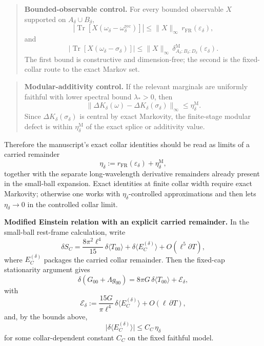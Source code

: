 \begin{quote}
\textbf{Bounded-observable control.} For every bounded observable \(X\) supported on \(A_\delta\cup B_\delta\),
\[
\left|
\operatorname{Tr}\!\left[X(\omega_\delta-\omega_\delta^{\mathrm{rec}})\right]
\right|
\le
\|X\|_\infty\,r_{\mathrm{FR}}(\varepsilon_\delta),
\]
and
\[
\left|
\operatorname{Tr}\!\left[X(\omega_\delta-\sigma_\delta)\right]
\right|
\le
\|X\|_\infty\,
\delta^{\mathrm M}_{A_\delta:B_\delta:D_\delta}(\varepsilon_\delta).
\]
The first bound is constructive and dimension-free; the second is the fixed-collar route to the exact Markov set.
\end{quote}

\begin{quote}
\textbf{Modular-additivity control.} If the relevant marginals are uniformly faithful with lower spectral bound \(\lambda_\ast>0\), then
\[
\|\Delta K_\delta(\omega)-\Delta K_\delta(\sigma_\delta)\|_\infty
\le
\eta_\delta^{\mathrm M}.
\]
Since \(\Delta K_\delta(\sigma_\delta)\) is central by exact Markovity, the finite-stage modular defect is within \(\eta_\delta^{\mathrm M}\) of the exact splice or additivity value.
\end{quote}

Therefore the manuscript's exact collar identities should be read as limits of a carried remainder
\[
\eta_\delta
:=
r_{\mathrm{FR}}(\varepsilon_\delta)
+
\eta_\delta^{\mathrm M},
\]
together with the separate long-wavelength derivative remainders already present in the small-ball expansion. Exact identities at finite collar width require exact Markovity; otherwise one works with \(\eta_\delta\)-controlled approximations and then lets \(\eta_\delta\to0\) in the controlled collar limit.

\textbf{Modified Einstein relation with an explicit carried remainder.} In the small-ball rest-frame calculation, write
\[
\delta S_C
=
\frac{8\pi^2\ell^4}{15}\,\delta\langle T_{00}\rangle
+
\delta\langle E_C^{(\delta)}\rangle
+
O(\ell^5\partial T),
\]
where \(E_C^{(\delta)}\) packages the carried collar remainder. Then the fixed-cap stationarity argument gives
\[
\delta\!\left(G_{00}+\Lambda g_{00}\right)
=
8\pi G\,\delta\langle T_{00}\rangle
+
\mathcal E_\delta,
\]
with
\[
\mathcal E_\delta
:=
\frac{15G}{\pi\ell^4}\,
\delta\langle E_C^{(\delta)}\rangle
+
O(\ell\,\partial T),
\]
and, by the bounds above,
\[
\bigl|
\delta\langle E_C^{(\delta)}\rangle
\bigr|
\le
C_C\,\eta_\delta
\]
for some collar-dependent constant \(C_C\) on the fixed faithful model.

